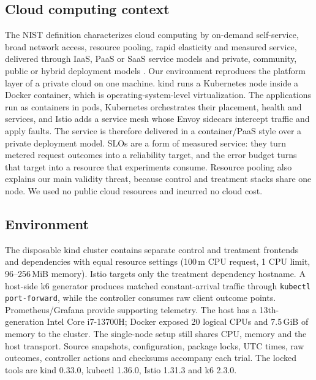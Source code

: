 \documentclass[a4paper,fleqn,11pt]{cas-dc}
\begin{document}
\subsection{Cloud computing context}
The NIST definition characterizes cloud computing by on-demand self-service, broad network access, resource pooling, rapid elasticity and measured service, delivered through IaaS, PaaS or SaaS service models and private, community, public or hybrid deployment models \citep{mell2011nist}. Our environment reproduces the platform layer of a private cloud on one machine. kind runs a Kubernetes node inside a Docker container, which is operating-system-level virtualization. The applications run as containers in pods, Kubernetes orchestrates their placement, health and services, and Istio adds a service mesh whose Envoy sidecars intercept traffic and apply faults. The service is therefore delivered in a container/PaaS style over a private deployment model. SLOs are a form of measured service: they turn metered request outcomes into a reliability target, and the error budget turns that target into a resource that experiments consume. Resource pooling also explains our main validity threat, because control and treatment stacks share one node. We used no public cloud resources and incurred no cloud cost.

\subsection{Environment}
The disposable kind cluster contains separate control and treatment frontends and dependencies with equal resource settings (100\,m CPU request, 1 CPU limit, 96--256\,MiB memory). Istio targets only the treatment dependency hostname. A host-side k6 generator produces matched constant-arrival traffic through \texttt{kubectl port-forward}, while the controller consumes raw client outcome points. Prometheus/Grafana provide supporting telemetry. The host has a 13th-generation Intel Core i7-13700H; Docker exposed 20 logical CPUs and 7.5\,GiB of memory to the cluster. The single-node setup still shares CPU, memory and the host transport. Source snapshots, configuration, package locks, UTC times, raw outcomes, controller actions and checksums accompany each trial. The locked tools are kind 0.33.0, kubectl 1.36.0, Istio 1.31.3 and k6 2.3.0.
\end{document}
